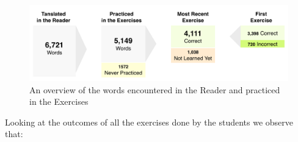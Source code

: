    \begin{figure}[h!]
  \centering
    \includegraphics[width=0.9\columnwidth]{figures/word-learning-flow.pdf}
    \caption{An overview of the words encountered in the Reader and practiced in the Exercises}
    \label{fig:word_learning_flow}
  \end{figure}

   Looking at the outcomes of all the exercises done by the students we observe that:

